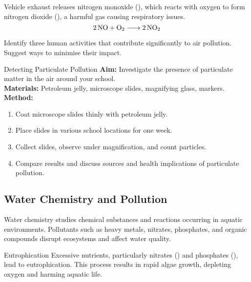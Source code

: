 
\begin{example}
Vehicle exhaust releases nitrogen monoxide (), which reacts with oxygen to form nitrogen dioxide (), a harmful gas causing respiratory issues.
\[
\ce{2NO + O2 -> 2NO2}
\]
\end{example}

\begin{stopandthink}
Identify three human activities that contribute significantly to air pollution. Suggest ways to minimise their impact.
\end{stopandthink}

\begin{investigation}{Detecting Particulate Pollution}
\textbf{Aim:} Investigate the presence of particulate matter in the air around your school.\\
\textbf{Materials:} Petroleum jelly, microscope slides, magnifying glass, markers.\\
\textbf{Method:}
\begin{enumerate}
\item Coat microscope slides thinly with petroleum jelly.
\item Place slides in various school locations for one week.
\item Collect slides, observe under magnification, and count particles.
\item Compare results and discuss sources and health implications of particulate pollution.
\end{enumerate}
\end{investigation}

\subsection{Water Chemistry and Pollution}

Water chemistry studies chemical substances and reactions occurring in aquatic environments. Pollutants such as heavy metals, nitrates, phosphates, and organic compounds disrupt ecosystems and affect water quality.

\begin{keyconcept}{Eutrophication}
Excessive nutrients, particularly nitrates () and phosphates (), lead to eutrophication. This process results in rapid algae growth, depleting oxygen and harming aquatic life.
\end{keyconcept}


